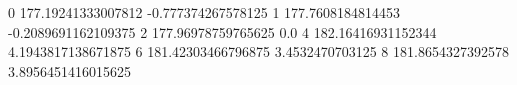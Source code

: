 0 177.19241333007812 -0.777374267578125
1 177.7608184814453 -0.2089691162109375
2 177.96978759765625 0.0
4 182.16416931152344 4.1943817138671875
6 181.42303466796875 3.4532470703125
8 181.8654327392578 3.8956451416015625
